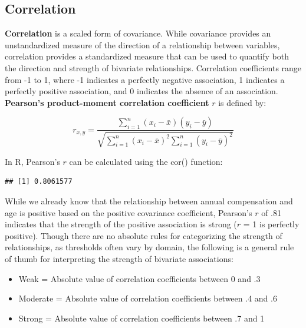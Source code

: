 \documentclass[]{book}
\newenvironment{Shaded}{\begin{snugshade}}{\end{snugshade}}
\newcommand{\CommentTok}[1]{\textcolor[rgb]{0.56,0.35,0.01}{\textit{#1}}}
\newcommand{\DataTypeTok}[1]{\textcolor[rgb]{0.13,0.29,0.53}{#1}}
\newcommand{\KeywordTok}[1]{\textcolor[rgb]{0.13,0.29,0.53}{\textbf{#1}}}
\newcommand{\NormalTok}[1]{#1}
\newcommand{\OperatorTok}[1]{\textcolor[rgb]{0.81,0.36,0.00}{\textbf{#1}}}
\newcommand{\StringTok}[1]{\textcolor[rgb]{0.31,0.60,0.02}{#1}}
\providecommand{\tightlist}{%
  \setlength{\itemsep}{0pt}\setlength{\parskip}{0pt}}
\begin{document}
\hypertarget{correlation}{%
\subsection{Correlation}\label{correlation}}

\textbf{Correlation} is a scaled form of covariance. While covariance provides an unstandardized measure of the direction of a relationship between variables, correlation provides a standardized measure that can be used to quantify both the direction and strength of bivariate relationships. Correlation coefficients range from -1 to 1, where -1 indicates a perfectly negative association, 1 indicates a perfectly positive association, and 0 indicates the absence of an association. \textbf{Pearson's product-moment correlation coefficient} \(r\) is defined by:

\[ r_{x,y} = \frac{\displaystyle\sum_{i=1}^{n} (x_{i}-\bar{x})(y_{i}-\bar{y})}{\sqrt{\displaystyle\sum_{i=1}^{n} (x_{i}-\bar{x})^2 \displaystyle\sum_{i=1}^{n} (y_{i}-\bar{y})^2}} \]

In R, Pearson's \(r\) can be calculated using the cor() function:

\begin{Shaded}
\end{Shaded}

\begin{verbatim}
## [1] 0.8061577
\end{verbatim}

While we already know that the relationship between annual compensation and age is positive based on the positive covariance coefficient, Pearson's \(r\) of .81 indicates that the strength of the positive association is strong (\(r\) = 1 is perfectly positive). Though there are no absolute rules for categorizing the strength of relationships, as thresholds often vary by domain, the following is a general rule of thumb for interpreting the strength of bivariate associations:

\begin{itemize}
\tightlist
\item
  Weak = Absolute value of correlation coefficients between 0 and .3
\item
  Moderate = Absolute value of correlation coefficients between .4 and .6
\item
  Strong = Absolute value of correlation coefficients between .7 and 1
\end{itemize}
\end{document}

